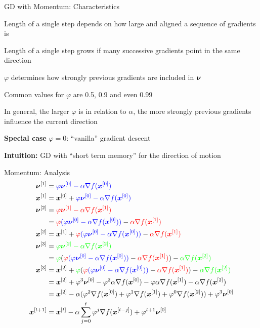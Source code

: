 \documentclass[11pt,compress,t,notes=noshow, xcolor=table]{beamer}
\begin{document}
\begin{framei}{GD with Momentum: Characteristics}
\item Length of a single step depends on how large and aligned a sequence of gradients is
\item Length of a single step grows if many successive gradients point in the same direction
\item $\varphi$ determines how strongly previous gradients are included in $\bm{\nu}$
\item Common values for $\varphi$ are 0.5, 0.9 and even 0.99
\item In general, the larger $\varphi$ is in relation to $\alpha$, the more strongly previous gradients influence the current direction
\item \textbf{Special case} $\varphi = 0$: ``vanilla'' gradient descent
\item \textbf{Intuition:} GD with ``short term memory'' for the direction of motion
\end{framei}


\begin{framev}[fs=footnotesize]{Momentum: Analysis}
$$
\begin{aligned}
\bm{\nu}^{[1]} &= \textcolor{blue}{\varphi \bm{\nu}^{[0]} - \alpha \nabla f(\bm{x}^{[0]})} \\
\bm{x}^{[1]} &= \bm{x}^{[0]} + \textcolor{blue}{\varphi \bm{\nu}^{[0]} - \alpha \nabla f(\bm{x}^{[0]})} \\
\bm{\nu}^{[2]} &= \textcolor{red}{\varphi \bm{\nu}^{[1]} - \alpha \nabla f(\bm{x}^{[1]})} \\
&= \textcolor{red}{\varphi} \textcolor{blue}{(\varphi \bm{\nu}^{[0]} - \alpha \nabla f(\bm{x}^{[0]}))} - \textcolor{red}{\alpha \nabla f(\bm{x}^{[1]})} \\
\bm{x}^{[2]} &= \bm{x}^{[1]} +\textcolor{red}{\varphi} \textcolor{blue}{(\varphi \bm{\nu}^{[0]} - \alpha \nabla f(\bm{x}^{[0]}))} - \textcolor{red}{\alpha \nabla f(\bm{x}^{[1]})} \\
\bm{\nu}^{[3]} &= \textcolor{green}{\varphi \bm{\nu}^{[2]} - \alpha \nabla f(\bm{x}^{[2]})} \\
&= \textcolor{green}{\varphi} (\textcolor{red}{\varphi} \textcolor{blue}{(\varphi \bm{\nu}^{[0]} - \alpha \nabla f(\bm{x}^{[0]}))} - \textcolor{red}{\alpha \nabla f(\bm{x}^{[1]})}) - \textcolor{green}{\alpha \nabla f(\bm{x}^{[2]})} \\
\bm{x}^{[3]} &= \bm{x}^{[2]} + \textcolor{green}{\varphi} (\textcolor{red}{\varphi} \textcolor{blue}{(\varphi \bm{\nu}^{[0]} - \alpha \nabla f(\bm{x}^{[0]}))} - \textcolor{red}{\alpha \nabla f(\bm{x}^{[1]})}) - \textcolor{green}{\alpha \nabla f(\bm{x}^{[2]})}  \\
&= \bm{x}^{[2]} + \varphi^3\bm{\nu}^{[0]} - \varphi^2\alpha\nabla f(\bm{x}^{[0]}) - \varphi \alpha \nabla f(\bm{x}^{[1]}) - \alpha \nabla f(\bm{x}^{[2]}) \\
&= \bm{x}^{[2]} - \alpha(\varphi^2 \nabla f(\bm{x}^{[0]}) + \varphi^1 \nabla f(\bm{x}^{[1]}) + \varphi^0 \nabla f(\bm{x}^{[2]})) + \varphi^3 \bm{\nu}^{[0]} \\
\bm{x}^{[t+1]} &= \bm{x}^{[t]} - \alpha \displaystyle\sum_{j = 0}^{t} \varphi^j \nabla f(\bm{x}^{[t-j]}) + \varphi^{t+1}\bm{\nu}^{[0]}
\end{aligned}
$$
\end{framev}
\end{document}
